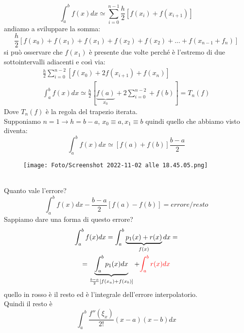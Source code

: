 \documentclass[a4paper, portrait]{book}
\numberwithin{equation}{chapter} %
\begin{document}
\begin{equation}
    \int_a^b f(x) dx \simeq \sum_{i= 0}^{n-1}\frac{h}{2}\left[f(x_i)+f(x_{i+1})\right]
\end{equation}
andiamo a sviluppare la somma:
\begin{equation}
    \frac{h}{2}[f(x_0)+f(x_1)+f(x_1)+f(x_2)+f(x_2)+...+f(x_{n-1}+f_n)]
\end{equation}
si può osservare che $f(x_1)$ è presente due volte perché è l'estremo di due sottointervalli adiacenti e così via:
\begin{gather}
    \frac{h}{2}\sum_{i=0}^{n-2}\left[f(x_0)+2f(x_{i+1})+f(x_n)\right]\\
    \int_a^b f(x) dx \simeq \frac{h}{2}\left[\underbrace{f(a)}_{x_0}+2\sum_{i=0}^{n-2}+f(b)\right] = T_n(f)
\end{gather}
Dove $T_n(f)$ è la regola del trapezio iterata.\\
Supponiamo $n = 1 \rightarrow h = b-a$, $x_0 \equiv a, x_1 \equiv b$ quindi quello che abbiamo visto diventa:
\begin{equation}
    \int_a^b f(x) dx \simeq \left[f(a)+f(b)\right]\frac{b-a}{2}
\end{equation}
\begin{figure}[h!]
    \centering
    \texttt{[image: Foto/Screenshot 2022-11-02 alle 18.45.05.png]}
    \caption{}
\end{figure}
\\Quanto vale l'errore?
\begin{equation}
    \int_a^b f(x) dx - \frac{b-a}{2}\left[f(a) - f(b)\right] = errore/resto
\end{equation}
Sappiamo dare una forma di questo errore?
\begin{gather}
    \int_a^b f(x) dx = \int_a^b \underbrace{p_1(x)+r(x)}_{f(x)}dx =\\
    = \underbrace{\int_a^b p_1(x) dx}_{\frac{b-a}{2}[f(x_a)+f(x_b)]} + {\color{red}{\int_a^b r(x)dx}}
\end{gather}
quello in rosso è il resto ed è l'integrale dell'errore interpolatorio.\\
Quindi il resto è \begin{equation}
    \int_a^b \frac{f''(\xi_x)}{2!}(x-a)(x-b)dx
\end{equation}
\end{document}
